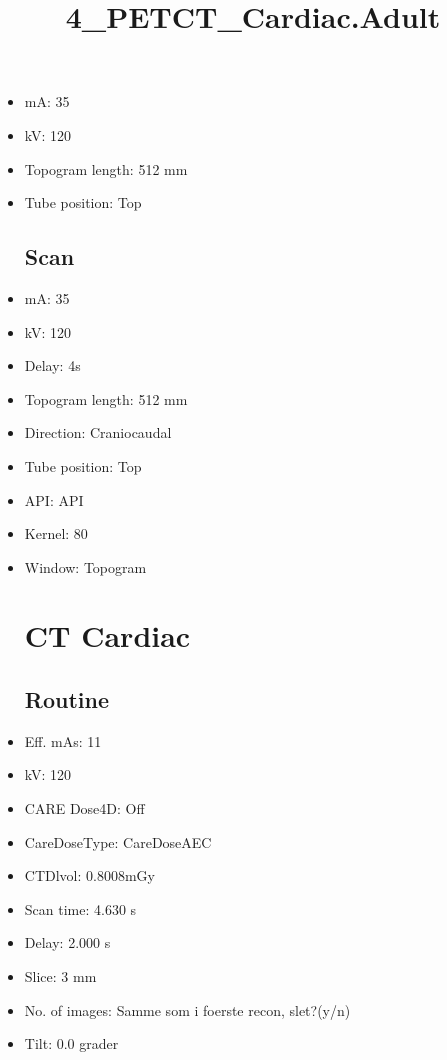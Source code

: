 \documentclass[12pt]{article}
\title{4\_PETCT\_Cardiac.Adult}
\begin{document}
\maketitle
\newpage
\tableofcontents
\newpage
{}


\begin{itemize}\section{Topogram}
\subsection{Routine}
\item mA: 35\item kV: 120\item Topogram length: 512 mm\item Tube position: Top
\subsection{Scan}\item mA: 35\item kV: 120\item Delay: 4s\item Topogram length: 512 mm\item Direction: Craniocaudal\item Tube position: Top\item API: API \item Kernel: 80\item Window: Topogram
\section{CT Cardiac}
\subsection{Routine}
\item Eff. mAs: 11\item kV: 120\item CARE Dose4D: Off\item CareDoseType: CareDoseAEC\item CTDlvol: 0.8008mGy\item Scan time: 4.630 s\item Delay: 2.000 s\item Slice: 3 mm\item No. of images: Samme som i foerste recon, slet?(y/n)\item Tilt: 0.0 grader

\end{itemize}
\end{document}
